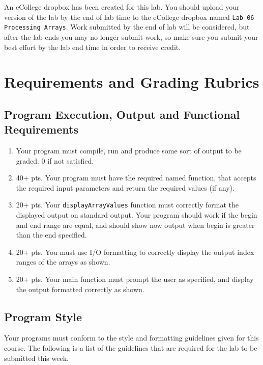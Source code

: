 \documentclass[11pt]{article}
\begin{document}
An eCollege dropbox has been created for this lab.  You should
upload your version of the lab by the end of lab time to the eCollege
dropbox named \verb~Lab 06 Processing Arrays~.  Work submitted by the end
of lab will be considered, but after the lab ends you may no longer
submit work, so make sure you submit your best effort by the lab end
time in order to receive credit.
\section*{Requirements and Grading Rubrics}
\label{sec-5}

\subsection*{Program Execution, Output and Functional Requirements}
\label{sec-5-1}

\begin{enumerate}
\item Your program must compile, run and produce some sort of output to be
graded. 0 if not satisfied.
\item 40+ pts.  Your program must have the required named function,
that accepts the required input parameters and return the required
values (if any).
\item 20+ pts. Your \verb~displayArrayValues~ function must correctly format
the displayed output on standard output.  Your program should work
if the begin and end range are equal, and should show now output
when begin is greater than the end specified.
\item 20+ pts.  You must use I/O formatting to correctly display the
output index ranges of the arrays as shown.
\item 20+ pts. Your main function must prompt the user as specified, and
display the output formatted correctly as shown.
\end{enumerate}

\subsection*{Program Style}
\label{sec-5-2}

Your programs must conform to the style and formatting guidelines given for this course.
The following is a list of the guidelines that are required for the lab to be submitted
this week.
\end{document}
